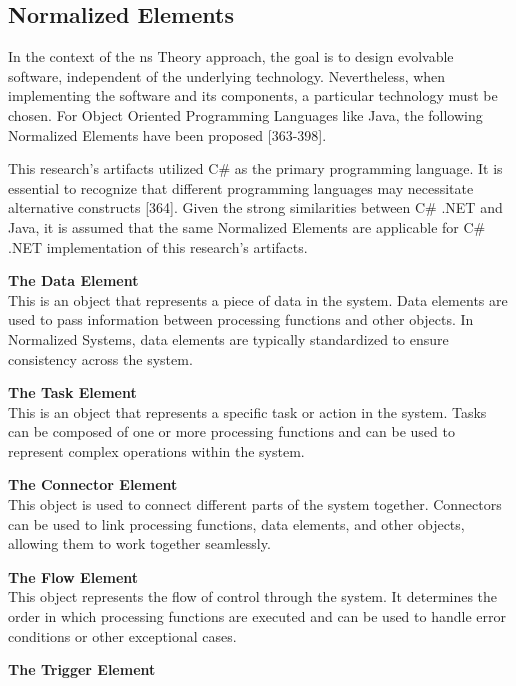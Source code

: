 \subsection{Normalized Elements} \label{subsec:ns_elements} 

In the context of the \gls{ns} Theory approach, the goal is to design evolvable software,
independent of the underlying technology. Nevertheless, when implementing the software and
its components, a particular technology must be chosen. For Object Oriented Programming
Languages like Java, the following Normalized Elements have been proposed
\parencite{mannaert_normalized_2016}[363-398].

This research's artifacts utilized C\# as the primary programming language. It is essential
to recognize that different programming languages may necessitate alternative constructs
\parencite{mannaert_normalized_2016}[364]. Given the strong similarities between C\# .NET
and Java, it is assumed that the same Normalized Elements are applicable for C\# .NET
implementation of this research's artifacts.

\textbf{The Data Element}\\
This is an object that represents a piece of data in the system. Data elements are used to
pass information between processing functions and other objects. In Normalized Systems,
data elements are typically standardized to ensure consistency across the system.

\textbf{The Task Element}\\
This is an object that represents a specific task or action in the system. Tasks can be
composed of one or more processing functions and can be used to represent complex
operations within the system.

\textbf{The Connector Element}\\
This object is used to connect different parts of the system together. Connectors can be
used to link processing functions, data elements, and other objects, allowing them to work
together seamlessly.

\textbf{The Flow Element}\\
This object represents the flow of control through the system. It determines the order in
which processing functions are executed and can be used to handle error conditions or
other exceptional cases.

\textbf{The Trigger Element}\\
